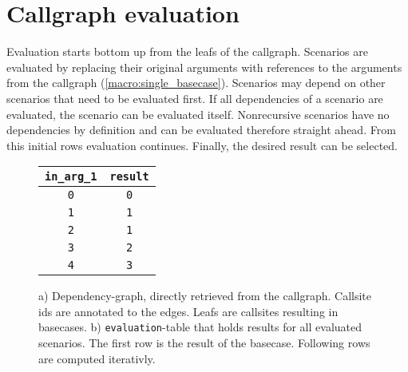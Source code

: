 \section{Callgraph evaluation}
Evaluation starts bottom up from the leafs of the callgraph. Scenarios are evaluated by replacing their original arguments with references to the arguments from the callgraph (\autoref{macro:single_basecase}). Scenarios may depend on other scenarios that need to be evaluated first. If all dependencies of a scenario are evaluated, the scenario can be evaluated itself. Nonrecursive scenarios have no dependencies by definition and can be evaluated therefore straight ahead. From this initial rows evaluation continues. Finally, the desired result can be selected.

\begin{figure}[h!]\small
    \begin{minipage}[b]{.45\linewidth}
    \centering
{}
    \subcaption{}\label{}
    \end{minipage}%
    \hfill
    \begin{minipage}[b]{.45\linewidth}
    \centering
    \begin{tabular}{c|c}
        \texttt{in\_arg\_1} & \texttt{result}\\
        \hline
        \hline
        \texttt{0} & \texttt{0}\\
        \hline
        \hline
        \texttt{1} & \texttt{1}\\
        \hline
        \texttt{2} & \texttt{1}\\
        \hline
        \texttt{3} & \texttt{2}\\
        \hline
        \texttt{4} & \texttt{3}\\
        \hline
    \end{tabular}
    \subcaption{}\label{fig:fib_callstack_cte}
    \end{minipage}
    \caption{a) Dependency-graph, directly retrieved from the callgraph. Callsite ids are annotated to the edges. Leafs are callsites resulting in basecases. b) \texttt{evaluation}-table that holds results for all evaluated scenarios. The first row is the result of the basecase. Following rows are computed iterativly.}\label{}
\end{figure}

